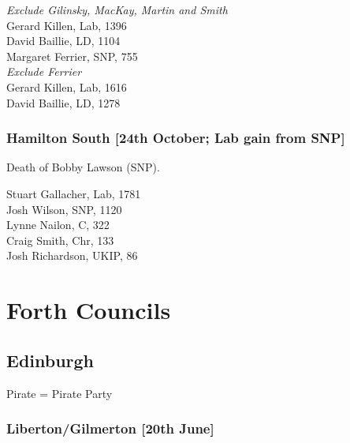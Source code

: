 \documentclass[a4paper,openany,10pt]{book}
\begin{document}
\emph{Exclude Gilinsky, MacKay, Martin and Smith}\\
Gerard Killen, Lab, 1396\\
David Baillie, LD, 1104\\
Margaret Ferrier, SNP, 755\\




\emph{Exclude Ferrier}\\
Gerard Killen, Lab, 1616\\
David Baillie, LD, 1278\\


\subsubsection*{Hamilton South \hspace*{\fill}\nolinebreak[1]%
\enspace\hspace*{\fill}
[24th October; Lab gain from SNP]}


Death of Bobby Lawson (SNP).



Stuart Gallacher, Lab, 1781\\
Josh Wilson, SNP, 1120\\
Lynne Nailon, C, 322\\
Craig Smith, Chr, 133\\
Josh Richardson, UKIP, 86\\


\vfill

\section[Forth Councils]{{Forth Councils}}

\subsection*{Edinburgh}

Pirate = Pirate Party

\subsubsection*{Liberton\slash Gilmerton \hspace*{\fill}\nolinebreak[1]%
\enspace\hspace*{\fill}
[20th June]}
\end{document}
